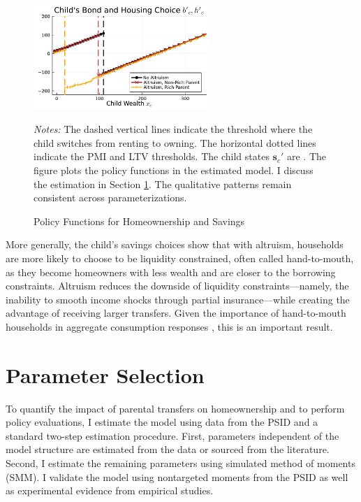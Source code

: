 \documentclass[12pt]{article}
\begin{document}
\begin{figure}\caption{Policy Functions for Homeownership and Savings}\label{fig:pol}
	\begin{center} 
	\includegraphics[width=0.6\textwidth]{../tabfig/model/pol_bond.pdf}
	\end{center}
	{\begin{footnotesize} \textit{Notes:} The dashed vertical lines indicate the threshold where the child switches from renting to owning. The horizontal dotted lines indicate the PMI and LTV thresholds. The child states $\mathbf{s}_c'$ are \unskip. The figure plots the policy functions in the estimated model. I discuss the estimation in Section \ref{sec:estimation}. The qualitative patterns remain consistent across parameterizations. \end{footnotesize}}
\end{figure}

More generally, the child's savings choices show that with altruism, households are more likely to choose to be liquidity constrained, often called hand-to-mouth, as they become homeowners with less wealth and are closer to the borrowing constraints. Altruism reduces the downside of liquidity constraints---namely, the inability to smooth income shocks through partial insurance---while creating the advantage of receiving larger transfers. Given the importance of hand-to-mouth households in aggregate consumption responses \citep[see, e.g.,][]{Kaplan2014a,Boar2020}, this is an important result.

\section{Parameter Selection}\label{sec:estimation}
To quantify the impact of parental transfers on homeownership and to perform policy evaluations, I estimate the model using data from the PSID and a standard two-step estimation procedure. First, parameters independent of the model structure are estimated from the data or sourced from the literature. Second, I estimate the remaining parameters using simulated method of moments (SMM). I validate the model using nontargeted moments from the PSID as well as experimental evidence from empirical studies. 
\end{document}
